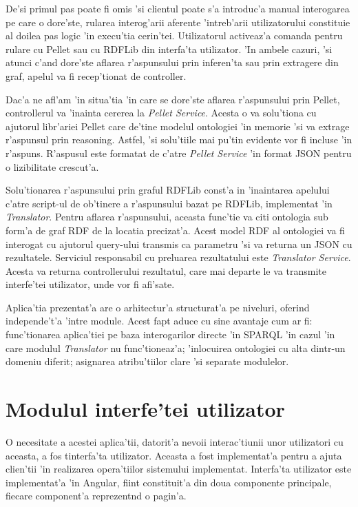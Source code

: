 \documentclass[12pt,a4paper,twoside]{report}
\begin{document}
De'si primul pas poate fi omis 'si clientul poate s'a introduc'a manual interogarea pe care o dore'ste, rularea interog'arii aferente 'intreb'arii utilizatorului constituie al doilea pas logic 'in execu'tia cerin'tei. Utilizatorul activeaz'a comanda pentru rulare cu Pellet sau cu RDFLib din interfa'ta utilizator. 'In ambele cazuri, 'si atunci c'and dore'ste aflarea r'aspunsului prin inferen'ta sau prin extragere din graf, apelul va fi recep'tionat de controller. 

Dac'a ne afl'am 'in situa'tia 'in care se dore'ste aflarea r'aspunsului prin Pellet, controllerul  va 'inainta cererea la {\it Pellet Service}. Acesta o va solu'tiona cu ajutorul libr'ariei Pellet care de'tine modelul ontologiei 'in memorie 'si va extrage r'aspunsul prin reasoning. Astfel, 'si solu'tiile mai pu'tin evidente vor fi incluse 'in r'aspuns. R'aspusul este formatat de c'atre {\it Pellet Service} 'in format JSON pentru o lizibilitate crescut'a.

Solu'tionarea r'aspunsului prin graful RDFLib const'a in 'inaintarea apelului c'atre script-ul de ob'tinere a r'aspunsului bazat pe RDFLib, implementat 'in {\it Translator}. Pentru aflarea r'aspunsului, aceasta func'tie va citi ontologia sub form'a de graf RDF de la locatia precizat'a. Acest model RDF al ontologiei va fi interogat cu ajutorul query-ului transmis ca parametru 'si va returna un JSON cu rezultatele. Serviciul responsabil cu preluarea rezultatului este {\it Translator Service}. Acesta va returna controllerului rezultatul, care mai departe le va transmite interfe'tei utilizator, unde vor fi afi'sate.

Aplica'tia prezentat'a are o arhitectur'a structurat'a pe niveluri, oferind independe't'a 'intre module. Acest fapt aduce cu sine avantaje cum ar fi: func'tionarea aplica'tiei pe baza interogarilor directe 'in SPARQL 'in cazul 'in care modulul {\it Translator} nu func'tioneaz'a; 'inlocuirea ontologiei cu alta dintr-un domeniu diferit; asignarea atribu'tiilor clare 'si separate modulelor. 




\section{Modulul interfe'tei utilizator}

O necesitate a acestei aplica'tii, datorit'a nevoii interac'tiunii unor utilizatori cu aceasta, a fos tinterfa'ta utilizator. Aceasta a fost implementat'a pentru a ajuta clien'tii 'in realizarea opera'tiilor sistemului implementat. Interfa'ta utilizator este implementat'a 'in Angular, fiint constituit'a din doua componente principale, fiecare component'a reprezent\ia nd o pagin'a.
\end{document}
